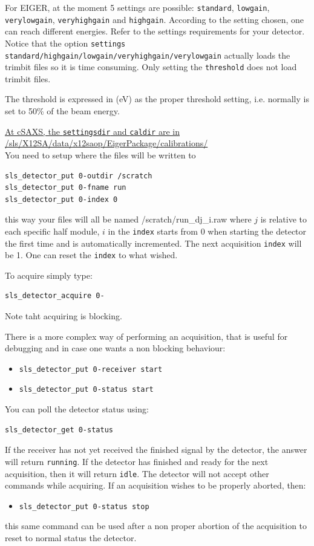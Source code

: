 \documentclass{article}
\newcommand{\E}{EIGER\xspace}
\begin{document}
For \E, at the moment 5 settings are possible: {\tt{standard}}, {\tt{lowgain}}, {\tt{verylowgain}}, {\tt{veryhighgain}} and {\tt{highgain}}. According to the setting chosen, one can reach different energies. Refer to the settings requirements for your detector.\\ 
Notice that the option {\tt{settings standard/highgain/lowgain/veryhighgain/verylowgain}} actually loads the trimbit files so it is time consuming. Only setting the {\tt{threshold}} does not load trimbit files.  

The threshold is expressed in (eV) as the proper threshold setting, i.e. normally is set to 50\% of the beam energy.  

\underline{At cSAXS, the {\tt{settingsdir}} and {\tt{caldir}} are in}\\\underline{/sls/X12SA/data/x12saop/EigerPackage/calibrations/}\\ 

You need to setup where the files will be written to
\begin{verbatim}
sls_detector_put 0-outdir /scratch
sls_detector_put 0-fname run
sls_detector_put 0-index 0
\end{verbatim}
this way your files will all be named /scratch/run\_dj\_i.raw where $j$ is relative to each specific half module, $i$ in the {\tt{index}} starts from 0 when starting the detector the first time and is automatically incremented. The next acquisition {\tt{index}} will be 1. One can reset the  {\tt{index}} to what wished.

To acquire simply type:
\begin{verbatim}
sls_detector_acquire 0-
\end{verbatim}
Note taht acquiring is blocking.

There is a more complex way of performing an acquisition, that is useful for debugging and in case one wants a non blocking behaviour: 
\begin{itemize}
\item {\tt{sls\_detector\_put 0-receiver start}} 
\item {\tt{sls\_detector\_put 0-status start}} 
\end{itemize}

You can poll the detector status using:
\begin{verbatim}
sls_detector_get 0-status 
\end{verbatim}
If the receiver has not yet received the finished signal by the detector, the answer will return {\tt{running}}. If the detector has finished and ready for the next acquisition, then it will return {\tt{idle}}.
The detector will not accept other commands while acquiring. If an acquisition wishes to be properly aborted, then:
\begin{itemize}
\item {\tt{sls\_detector\_put 0-status stop}} 
\end{itemize}
this same command can be used after a non proper abortion of the acquisition to reset to normal status the detector.
\end{document}

